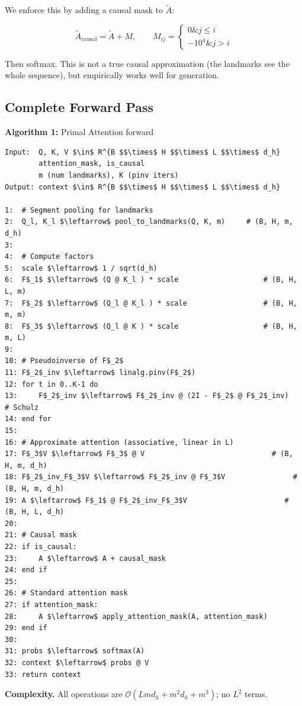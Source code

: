 We enforce this by adding a causal mask to $\tilde{A}$:

\begin{equation}
\tilde{A}_\text{causal} = \tilde{A} + M, \qquad
M_{ij} = \begin{cases} 0 \& j \le i \\ -10^4 \& j > i \end{cases}
\end{equation}

Then softmax. This is not a true causal approximation (the landmarks see 
the whole sequence), but empirically works well for generation.

\subsection{Complete Forward Pass}

\textbf{Algorithm 1:} Primal Attention forward
\begin{lstlisting}
Input:  Q, K, V $\in$ R^{B $$\times$ H $$\times$ L $$\times$ d_h}
        attention_mask, is_causal
        m (num landmarks), K (pinv iters)
Output: context $\in$ R^{B $$\times$ H $$\times$ L $$\times$ d_h}

1:  # Segment pooling for landmarks
2:  Q_l, K_l $\leftarrow$ pool_to_landmarks(Q, K, m)     # (B, H, m, d_h)
3:
4:  # Compute factors
5:  scale $\leftarrow$ 1 / sqrt(d_h)
6:  F$_1$ $\leftarrow$ (Q @ K_l ) * scale                    # (B, H, L, m)
7:  F$_2$ $\leftarrow$ (Q_l @ K_l ) * scale                  # (B, H, m, m)
8:  F$_3$ $\leftarrow$ (Q_l @ K ) * scale                    # (B, H, m, L)
9:
10: # Pseudoinverse of F$_2$
11: F$_2$_inv $\leftarrow$ linalg.pinv(F$_2$)
12: for t in 0..K-1 do
13:     F$_2$_inv $\leftarrow$ F$_2$_inv @ (2I - F$_2$ @ F$_2$_inv)   # Schulz
14: end for
15:
16: # Approximate attention (associative, linear in L)
17: F$_3$V $\leftarrow$ F$_3$ @ V                              # (B, H, m, d_h)
18: F$_2$_inv_F$_3$V $\leftarrow$ F$_2$_inv @ F$_3$V                # (B, H, m, d_h)
19: A $\leftarrow$ F$_1$ @ F$_2$_inv_F$_3$V                       # (B, H, L, d_h)
20:
21: # Causal mask
22: if is_causal:
23:     A $\leftarrow$ A + causal_mask
24: end if
25:
26: # Standard attention mask
27: if attention_mask:
28:     A $\leftarrow$ apply_attention_mask(A, attention_mask)
29: end if
30:
31: probs $\leftarrow$ softmax(A)
32: context $\leftarrow$ probs @ V
33: return context
\end{lstlisting}

\textbf{Complexity.} All operations are $\mathcal{O}(L m d_h + m^2 d_h + m^3)$; no 
$L^2$ terms.

